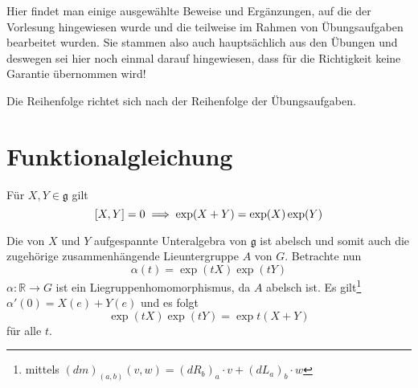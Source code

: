 Hier findet man einige ausgewählte Beweise und Ergänzungen, auf die der Vorlesung hingewiesen wurde und die teilweise im Rahmen von Übungsaufgaben bearbeitet wurden.
Sie stammen also auch hauptsächlich aus den Übungen und deswegen sei hier noch einmal darauf hingewiesen, dass für die Richtigkeit keine Garantie übernommen wird!

Die Reihenfolge richtet sich nach der Reihenfolge der Übungsaufgaben.

\section{Funktionalgleichung} %
\label{sec:funktionalgleichung}
Für $X,Y \in \mathfrak{g}$ gilt
\[
	\benbrace*{X,Y} = 0 \implies \exp(X+Y) = \exp(X) \exp(Y)
\]
\begin{beweis}
	Die von $X$ und $Y$ aufgespannte Unteralgebra von $\mathfrak{g}$ ist abelsch und somit auch die zugehörige zusammenhängende Lieuntergruppe $A$ von $G$.
	Betrachte nun
	\[
		\alpha(t) = \exp(t X) \exp(t Y)
	\]
	$\alpha \colon \mathbb{R} \to G$ ist ein Liegruppenhomomorphismus, da $A$ abelsch ist.
	Es gilt\footnote{mittels $(d m)_{(a,b)}(v,w) = (d R_b)_a \cdot v + (d L_a)_b \cdot w$} $\alpha'(0) = X(e) + Y(e)$ und es folgt
	\[
		\exp(t X) \exp(tY) = \exp t (X+Y)
	\]
	für alle $t$.
\end{beweis}

